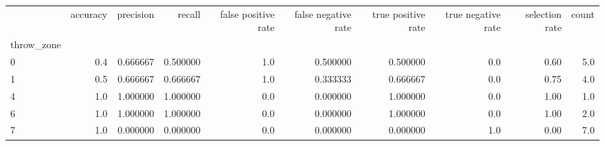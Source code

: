 \begin{tabular}{lrrrrrrrrr}
\toprule
{} &  accuracy &  precision &    recall &  false positive rate &  false negative rate &  true positive rate &  true negative rate &  selection rate &  count \\
throw\_zone &           &            &           &                      &                      &                     &                     &                 &        \\
\midrule
0          &       0.4 &   0.666667 &  0.500000 &                  1.0 &             0.500000 &            0.500000 &                 0.0 &            0.60 &    5.0 \\
1          &       0.5 &   0.666667 &  0.666667 &                  1.0 &             0.333333 &            0.666667 &                 0.0 &            0.75 &    4.0 \\
4          &       1.0 &   1.000000 &  1.000000 &                  0.0 &             0.000000 &            1.000000 &                 0.0 &            1.00 &    1.0 \\
6          &       1.0 &   1.000000 &  1.000000 &                  0.0 &             0.000000 &            1.000000 &                 0.0 &            1.00 &    2.0 \\
7          &       1.0 &   0.000000 &  0.000000 &                  0.0 &             0.000000 &            0.000000 &                 1.0 &            0.00 &    7.0 \\
\bottomrule
\end{tabular}
